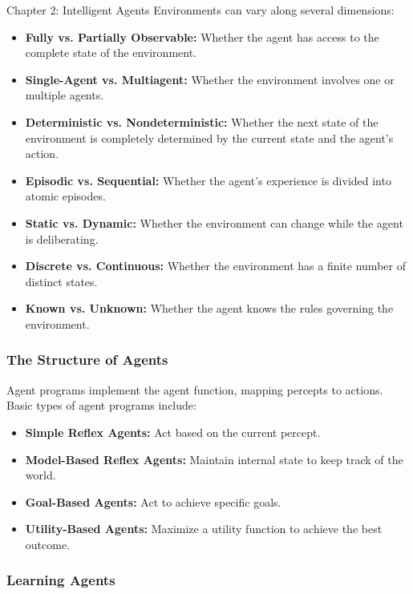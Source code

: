 \begin{notes}{Chapter 2: Intelligent Agents}
    Environments can vary along several dimensions:
    \begin{itemize}
        \item \textbf{Fully vs. Partially Observable:} Whether the agent has access to the complete state of the environment.
        \item \textbf{Single-Agent vs. Multiagent:} Whether the environment involves one or multiple agents.
        \item \textbf{Deterministic vs. Nondeterministic:} Whether the next state of the environment is completely determined by the current state and the agent's action.
        \item \textbf{Episodic vs. Sequential:} Whether the agent's experience is divided into atomic episodes.
        \item \textbf{Static vs. Dynamic:} Whether the environment can change while the agent is deliberating.
        \item \textbf{Discrete vs. Continuous:} Whether the environment has a finite number of distinct states.
        \item \textbf{Known vs. Unknown:} Whether the agent knows the rules governing the environment.
    \end{itemize}

    \subsubsection*{The Structure of Agents}

    Agent programs implement the agent function, mapping percepts to actions. Basic types of agent programs include:
    \begin{itemize}
        \item \textbf{Simple Reflex Agents:} Act based on the current percept.
        \item \textbf{Model-Based Reflex Agents:} Maintain internal state to keep track of the world.
        \item \textbf{Goal-Based Agents:} Act to achieve specific goals.
        \item \textbf{Utility-Based Agents:} Maximize a utility function to achieve the best outcome.
    \end{itemize}

    \subsubsection*{Learning Agents}


\end{notes}
